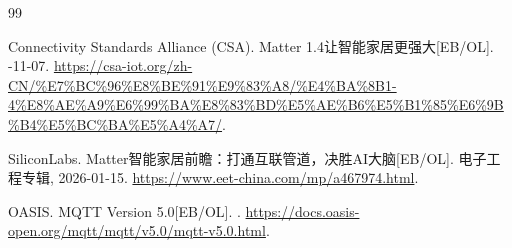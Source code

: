 
\begin{thebibliography}{99}

Connectivity Standards Alliance (CSA).
\newblock Matter 1.4让智能家居更强大[EB/OL].
-11-07.
\newblock \url{https://csa-iot.org/zh-CN/%E7%BC%96%E8%BE%91%E9%83%A8/%E4%BA%8B1-4%E8%AE%A9%E6%99%BA%E8%83%BD%E5%AE%B6%E5%B1%85%E6%9B%B4%E5%BC%BA%E5%A4%A7/}.

SiliconLabs.
 Matter智能家居前瞻：打通互联管道，决胜AI大脑[EB/OL].
\newblock 电子工程专辑, 2026-01-15.
\newblock \url{https://www.eet-china.com/mp/a467974.html}.

OASIS.
\newblock MQTT Version 5.0[EB/OL].
.
\newblock \url{https://docs.oasis-open.org/mqtt/mqtt/v5.0/mqtt-v5.0.html}.

\end{thebibliography}
